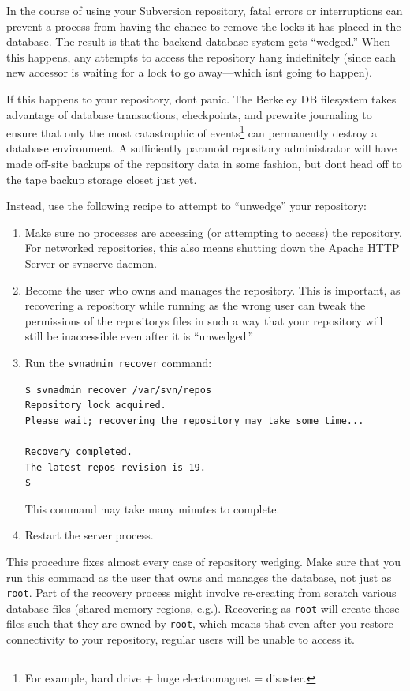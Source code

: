 In the course of using your Subversion repository, fatal errors or
interruptions can prevent a process from having the chance to remove the
locks it has placed in the database. The result is that the backend
database system gets ``wedged.'' When this happens, any attempts to
access the repository hang indefinitely (since each new accessor is
waiting for a lock to go away---which isn\textquotesingle t going to
happen).

If this happens to your repository, don\textquotesingle t panic. The
Berkeley DB filesystem takes advantage of database transactions,
checkpoints, and prewrite journaling to ensure that only the most
catastrophic of events\footnote{For example, hard drive + huge
  electromagnet = disaster.} can permanently destroy a database
environment. A sufficiently paranoid repository administrator will have
made off-site backups of the repository data in some fashion, but
don\textquotesingle t head off to the tape backup storage closet just
yet.

Instead, use the following recipe to attempt to ``unwedge'' your
repository:

\begin{enumerate}
\def\labelenumi{\arabic{enumi}.}
\item
  Make sure no processes are accessing (or attempting to access) the
  repository. For networked repositories, this also means shutting down
  the Apache HTTP Server or svnserve daemon.
\item
  Become the user who owns and manages the repository. This is
  important, as recovering a repository while running as the wrong user
  can tweak the permissions of the repository\textquotesingle s files in
  such a way that your repository will still be inaccessible even after
  it is ``unwedged.''
\item
  Run the \texttt{svnadmin\ recover} command:

\begin{verbatim}
$ svnadmin recover /var/svn/repos
Repository lock acquired.
Please wait; recovering the repository may take some time...

Recovery completed.
The latest repos revision is 19.
$
\end{verbatim}

  This command may take many minutes to complete.
\item
  Restart the server process.
\end{enumerate}

This procedure fixes almost every case of repository wedging. Make sure
that you run this command as the user that owns and manages the
database, not just as \texttt{root}. Part of the recovery process might
involve re-creating from scratch various database files (shared memory
regions, e.g.). Recovering as \texttt{root} will create those files such
that they are owned by \texttt{root}, which means that even after you
restore connectivity to your repository, regular users will be unable to
access it.

